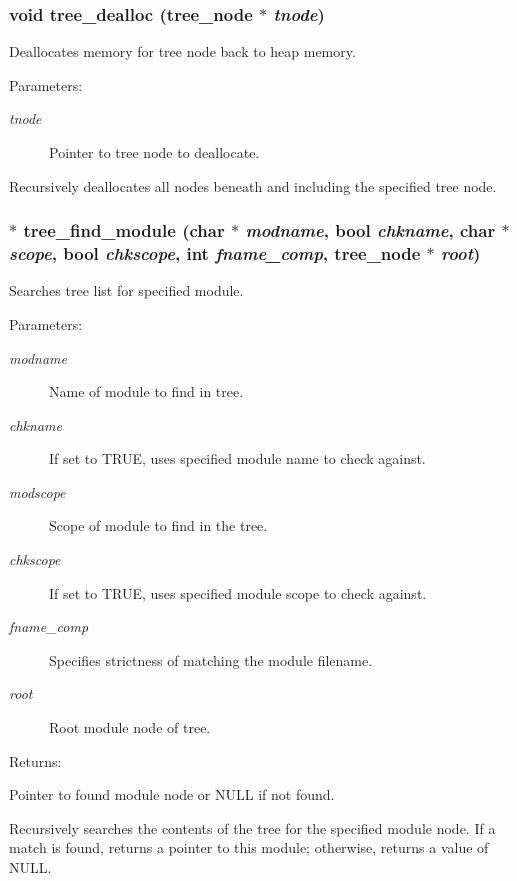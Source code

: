 \subsubsection{\setlength{\rightskip}{0pt plus 5cm}void tree\_\-dealloc ({\bf tree\_\-node} $\ast$ {\em tnode})}\label{tree_8c_a6}


Deallocates memory for tree node back to heap memory.

\begin{Desc}
\item[Parameters: ]\par
\begin{description}
\item[{\em 
tnode}]Pointer to tree node to deallocate.\end{description}
\end{Desc}
Recursively deallocates all nodes beneath and including the specified tree node. 
\subsubsection{$\ast$ tree\_\-find\_\-module (char $\ast$ {\em modname}, {\bf bool} {\em chkname}, char $\ast$ {\em scope}, {\bf bool} {\em chkscope}, int {\em fname\_\-comp}, {\bf tree\_\-node} $\ast$ {\em root})}\label{tree_8c_a5}


Searches tree list for specified module.

\begin{Desc}
\item[Parameters: ]\par
\begin{description}
\item[{\em 
modname}]Name of module to find in tree. \item[{\em 
chkname}]If set to TRUE, uses specified module name to check against. \item[{\em 
modscope}]Scope of module to find in the tree. \item[{\em 
chkscope}]If set to TRUE, uses specified module scope to check against. \item[{\em 
fname\_\-comp}]Specifies strictness of matching the module filename. \item[{\em 
root}]Root module node of tree. \end{description}
\end{Desc}
\begin{Desc}
\item[Returns: ]\par
Pointer to found module node or NULL if not found.\end{Desc}
Recursively searches the contents of the tree for the specified module node. If a match is found, returns a pointer to this module; otherwise, returns a value of NULL. 
